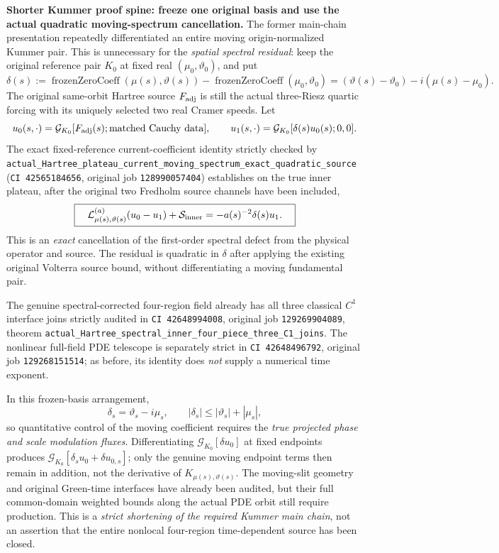 \documentclass[11pt]{amsart}
\begin{document}
\medskip
\noindent\textbf{Shorter Kummer proof spine: freeze one original basis and
use the actual quadratic moving-spectrum cancellation.}
The former main-chain presentation repeatedly differentiated
an entire moving origin-normalized Kummer pair. This is
unnecessary for the \emph{spatial spectral residual}:
keep the original reference pair \(K_0\) at fixed real
\((\mu_0,\vartheta_0)\), and put
\[
 \delta(s):=\operatorname{frozenZeroCoeff}
    (\mu(s),\vartheta(s))
   -\operatorname{frozenZeroCoeff}(\mu_0,\vartheta_0)
   =(\vartheta(s)-\vartheta_0)
       -i(\mu(s)-\mu_0).
\]
The original same-orbit Hartree source
\(F_{\rm adj}\) is still the actual three-Riesz
quartic forcing with its uniquely selected two
real Cramer speeds. Let
\[
 u_0(s,\cdot)=\mathcal G_{K_0}[F_{\rm adj}(s);
             \text{matched Cauchy data}],\qquad
 u_1(s,\cdot)=\mathcal G_{K_0}[\delta(s)u_0(s);
             0,0].
\]
The exact fixed-reference current-coefficient identity
strictly checked by
\texttt{actual\_Hartree\_plateau\_current\_moving\_spectrum\_exact\_quadratic\_source}
(\texttt{CI 42565184656}, original job
\texttt{128990057404}) establishes on the true
inner plateau, after the original two Fredholm source
channels have been included,
\[
 \boxed{\quad
 \mathcal L_{\mu(s),\vartheta(s)}^{(a)}(u_0-u_1)
      +\mathcal S_{\rm inner}
    =-a(s)^{-2}\delta(s)u_1.
 \quad}
\]
This is an \emph{exact} cancellation of the first-order
spectral defect from the physical operator and source.
The residual is quadratic in \(\delta\) after
applying the existing original Volterra source bound,
without differentiating a moving fundamental pair.

The genuine spectral-corrected four-region field
already has all three classical \(C^1\) interface
joins strictly audited in
\texttt{CI 42648994008}, original job
\texttt{129269904089},
theorem
\texttt{actual\_Hartree\_spectral\_inner\_four\_piece\_three\_C1\_joins}.
The nonlinear full-field PDE telescope is separately
strict in \texttt{CI 42648496792}, original job
\texttt{129268151514}; as before, its identity
does \emph{not} supply a numerical time exponent.

In this frozen-basis arrangement,
\[
 \delta_s=\vartheta_s-i\mu_s,\qquad
 |\delta_s|\le|\vartheta_s|+|\mu_s|,
\]
so quantitative control of the moving coefficient
requires the \emph{true projected phase and scale
modulation fluxes}. Differentiating
\(\mathcal G_{K_0}[\delta u_0]\) at fixed
endpoints produces
\(\mathcal G_{K_0}[\delta_su_0+\delta u_{0,s}]\);
only the genuine moving endpoint terms then
remain in addition, not the derivative of
\(K_{\mu(s),\vartheta(s)}\).
The moving-slit geometry and original Green-time
interfaces have already been audited, but their
full common-domain weighted bounds along the actual
PDE orbit still require production. This is a
\emph{strict shortening of the required Kummer
main chain}, not an assertion that the entire
nonlocal four-region time-dependent source has
been closed.
\end{document}
